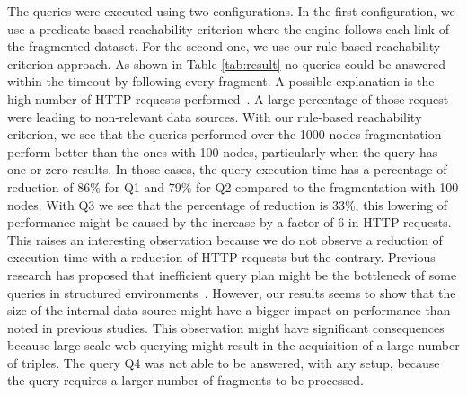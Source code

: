 The queries were executed using two configurations.
In the first configuration, we use a predicate-based reachability criterion where the engine follows each link of the fragmented dataset.
For the second one, we use our rule-based reachability criterion approach.
As shown in Table \ref{tab:result} no queries could be answered within the timeout by following every fragment.
A possible explanation is the high number of HTTP requests performed~\cite{Hartig2016}. 
A large percentage of those request were leading to non-relevant data sources.
With our rule-based reachability criterion, we see that the queries performed over the 1000 nodes fragmentation perform better than the ones with 100 nodes, particularly when the query has one or zero results.
In those cases, the query execution time has a percentage of reduction of 86\% for Q1 and 79\% for Q2 compared to the fragmentation with 100 nodes.
With Q3 we see that the percentage of reduction is 33\%, this lowering of performance might be caused by the increase by a factor of 6 in HTTP requests.
This raises an interesting observation because we do not observe a reduction of execution time with a reduction of HTTP requests but the contrary.
Previous research has proposed that inefficient query plan might be the bottleneck of some queries in structured environments~\cite{taelman2023,eschauzier_quweda_2023}.
However, our results seems to show that the size of the internal data source might have a bigger impact on performance than noted in previous studies.
This observation might have significant consequences because large-scale web querying might result in the acquisition of a large number of triples.
The query Q4 was not able to be answered, with any setup, because the query requires a larger number of fragments to be processed.